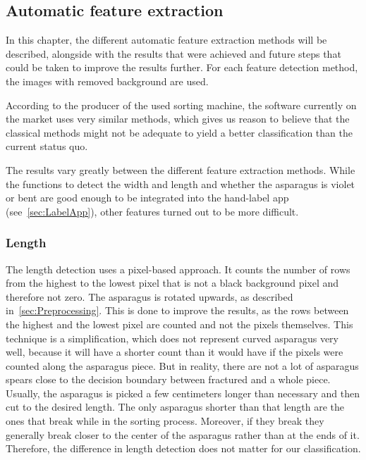 \subsection{Automatic feature extraction}
\label{sec:AutomaticFeatureExtraction}

In this chapter, the different automatic feature extraction methods will be described, alongside with the results that were achieved and future steps that could be taken to improve the results further. For each feature detection method, the images with removed background are used. 

\bigskip
According to the producer of the used sorting machine, the software currently on the market uses very similar methods, which gives us reason to believe that the classical methods might not be adequate to yield a better classification than the current status quo.

The results vary greatly between the different feature extraction methods. While the functions to detect the width and length and whether the asparagus is violet or bent are good enough to be integrated into the hand-label app (see~\autoref{sec:LabelApp}), other features turned out to be more difficult.


\subsubsection{Length}
\label{subsec:Length}

The length detection uses a pixel-based approach. It counts the number of rows from the highest to the lowest pixel that is not a black background pixel and therefore not zero. The asparagus is rotated upwards, as described in~\autoref{sec:Preprocessing}. This is done to improve the results, as the rows between the highest and the lowest pixel are counted and not the pixels themselves. This technique is a simplification, which does not represent curved asparagus very well, because it will have a shorter count than it would have if the pixels were counted along the asparagus piece. But in reality, there are not a lot of asparagus spears close to the decision boundary between fractured and a whole piece. Usually, the asparagus is picked a few centimeters longer than necessary and then cut to the desired length. The only asparagus shorter than that length are the ones that break while in the sorting process. Moreover, if they break they generally break closer to the center of the asparagus rather than at the ends of it. Therefore, the difference in length detection does not matter for our classification.

